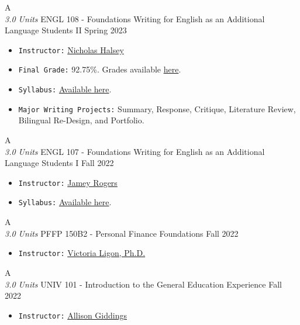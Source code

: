 \cventry
{A \\ \small{\textit{3.0 Units}}}
{ENGL 108 - Foundations Writing for English as an Additional Language Students II}
{Spring 2023}
{}
{}
{
  \begin{itemize}
    \item \texttt{Instructor:} \href{https://english.arizona.edu/people/nicholas-barlow-halsey}{Nicholas Halsey}
    \item \texttt{Final Grade:} 92.75\%. Grades available \href{https://mhrezaei.com/assets/cv/courses/Spring2023/ENGL108/Grades.pdf}{here}.
    \item \texttt{Syllabus:} \href{https://mhrezaei.com/assets/cv/courses/Spring2023/ENGL108/Syllabus.pdf}{Available here}.
    \item \texttt{Major Writing Projects:} Summary, Response, Critique, Literature Review, Bilingual Re-Design, and Portfolio.
  \end{itemize}
}

\cventry
{A \\ \small{\textit{3.0 Units}}}
{ENGL 107 - Foundations Writing for English as an Additional Language Students I}
{Fall 2022}
{}
{}
{
  \begin{itemize}
    \item \texttt{Instructor:} \href{https://english.arizona.edu/people/jamey-rogers}{Jamey Rogers}
    \item \texttt{Syllabus:} \href{https://mhrezaei.com/assets/cv/courses/Fall2022/ENGL107/Syllabus.pdf}{Available here}.
  \end{itemize}
}

\cventry
{A \\ \small{\textit{3.0 Units}}}
{PFFP 150B2 - Personal Finance Foundations}
{Fall 2022}
{}
{}
{
  \begin{itemize}
    \item \texttt{Instructor:} \href{https://norton.arizona.edu/person/victoria-ligon-phd}{Victoria Ligon, Ph.D.}
  \end{itemize}
}

\cventry
{A \\ \small{\textit{3.0 Units}}}
{UNIV 101 - Introduction to the General Education Experience}
{Fall 2022}
{}
{}
{
  \begin{itemize}
    \item \texttt{Instructor:} \href{https://rec.arizona.edu/staff/allison-giddings}{Allison Giddings}
  \end{itemize}
}